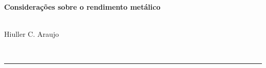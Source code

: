 \begin{center}
{\sffamily \begin{huge}\textbf{
	Considerações sobre o rendimento metálico
	}\end{huge}\\[10pt]
{Hiuller C. Araujo}
}\\
	\begin{abstract}
		Este trabalho apresenta os resultados de uma investigação realizada para elencar os parâmetros de processo com impacto no rendimento em aço da Aciaria 2. Os principais fatores que impactaram no rendimento metálico em 2013 foram: (a) o consumo de sucata tipo B; (b) consumo específico de sínter e (c) o consumo de ferroligas. 
		
		Foram desenvolvidos modelos estatísticos de regressão múltipla para identificar a causa na mudança de patamar do rendimento. A migração da sucata CB para TA foi associada à queda do rendimento metálico observada na Aciaria 2. Em seguida, foi desenvolvido outro modelo para explicar o rendimento metálico sem a influência da sucata tipo B em função dos diversos fatores. A análise deste modelo mostrou que cada o efeito da adição de ligas é de 0,30\% em rendimento para cada  kg/t enquanto que o efeito do sínter é de 0,48\% por kg/t.		
	\end{abstract}
	\rule{4in}{0.5pt}
\end{center}
